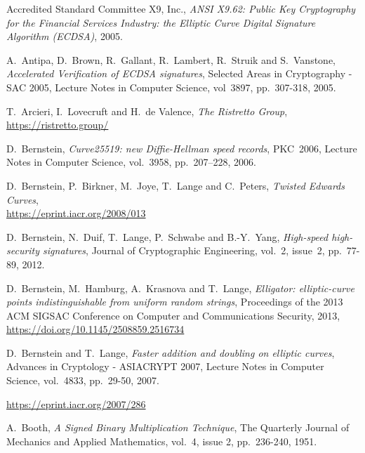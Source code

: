 \documentclass{llncs}
\begin{document}
\newpage
\begin{thebibliography}{20}

\RaggedRight

Accredited Standard Committee X9, Inc.,
\emph{ANSI X9.62: Public Key Cryptography for the Financial Services
Industry: the Elliptic Curve Digital Signature Algorithm (ECDSA)},
2005.

A.~Antipa, D.~Brown, R.~Gallant, R.~Lambert, R.~Struik and S.~Vanstone,
\emph{Accelerated Verification of ECDSA signatures},
Selected Areas in Cryptography - SAC 2005, Lecture Notes in Computer
Science, vol~3897, pp.~307-318, 2005.

T.~Arcieri, I.~Lovecruft and H.~de Valence,
\emph{The Ristretto Group},\\
\url{https://ristretto.group/}

D.~Bernstein,
\emph{Curve25519: new Diffie-Hellman speed records},
PKC~2006, Lecture Notes in Computer Science, vol.~3958, pp.~207--228,
2006.

D.~Bernstein, P.~Birkner, M.~Joye, T.~Lange and C.~Peters,
\emph{Twisted Edwards Curves},\\
\url{https://eprint.iacr.org/2008/013}

D.~Bernstein, N.~Duif, T.~Lange, P.~Schwabe and B.-Y.~Yang,
\emph{High-speed high-security signatures},
Journal of Cryptographic Engineering, vol.~2, issue~2, pp.~77-89, 2012.

D.~Bernstein, M.~Hamburg, A.~Krasnova and T.~Lange,
\emph{Elligator: elliptic-curve points indistinguishable from uniform
random strings},
Proceedings of the 2013 ACM SIGSAC Conference on Computer and Communications
Security, 2013,\\
\url{https://doi.org/10.1145/2508859.2516734}

D.~Bernstein and T.~Lange,
\emph{Faster addition and doubling on elliptic curves},
Advances in Cryptology - ASIACRYPT 2007, Lecture Notes in Computer
Science, vol.~4833, pp.~29-50, 2007.

\url{https://eprint.iacr.org/2007/286}

A.~Booth,
\emph{A Signed Binary Multiplication Technique},
The Quarterly Journal of Mechanics and Applied Mathematics,
vol.~4, issue 2, pp.~236-240, 1951.


\end{thebibliography}
\end{document}
